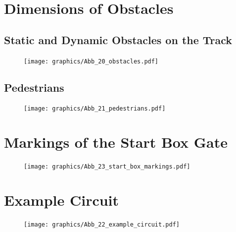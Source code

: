 \section{Dimensions of Obstacles}
\subsection{Static and Dynamic Obstacles on the Track}
\label{fig_obstacle_dimensions}
\begin{figure}[H]
	\begin{center}
		\centering\texttt{[image: graphics/Abb\_20\_obstacles.pdf]}
	\end{center}
\end{figure}

\subsection{Pedestrians}
\label{fig_pedestrians}
\begin{figure}[H]
	\begin{center}
		\centering\texttt{[image: graphics/Abb\_21\_pedestrians.pdf]}
	\end{center}
\end{figure}

\section{Markings of the Start Box Gate}
\label{fig_start_box_markings}
\begin{figure}[H]
	\begin{center}
		\centering\texttt{[image: graphics/Abb\_23\_start\_box\_markings.pdf]}
	\end{center}
\end{figure}

\section{Example Circuit}
\label{fig_example_circuit}
\vspace*{2cm}
\begin{figure}[H]
	\begin{center}
		\centering\texttt{[image: graphics/Abb\_22\_example\_circuit.pdf]}
	\end{center}
\end{figure}

